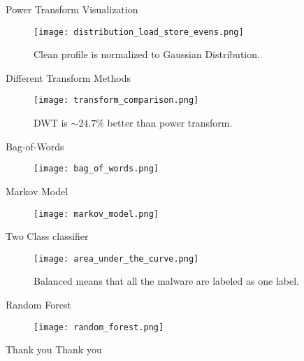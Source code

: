 \documentclass{beamer}
\begin{document}
\begin{frame}{Power Transform Visualization}
	\begin{figure}
		\centering
		\texttt{[image: distribution\_load\_store\_evens.png]}
		\caption{Clean profile is normalized to Gaussian Distribution.}
	\end{figure}
\end{frame}


\begin{frame}{Different Transform Methods}
	\begin{figure}
		\centering
		\texttt{[image: transform\_comparison.png]}
		\caption{DWT is $\sim24.7\%$ better than power transform.}
	\end{figure}
\end{frame}

\begin{frame}{Bag-of-Words}
	\begin{figure}
		\centering
		\texttt{[image: bag\_of\_words.png]}
	\end{figure}
\end{frame}


\begin{frame}{Markov Model}
	\begin{figure}
		\centering
		\texttt{[image: markov\_model.png]}
	\end{figure}
\end{frame}

\begin{frame}{Two Class classifier}
	\begin{figure}
		\centering
		\texttt{[image: area\_under\_the\_curve.png]}
		\caption{Balanced means that all the malware are labeled as one label.}
	\end{figure}
\end{frame}

\begin{frame}{Random Forest}
	\begin{figure}
		\centering
		\texttt{[image: random\_forest.png]}
	\end{figure}
\end{frame}

\begin{frame}{Thank you}
	Thank you~	
\end{frame}
\end{document}
